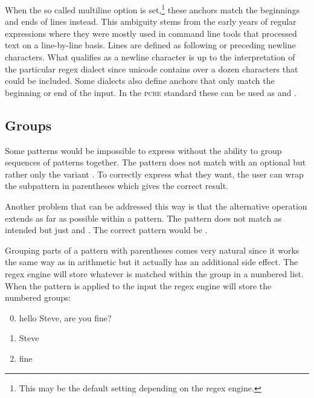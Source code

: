 When the so called multiline option is set,\footnote{This may be the default setting depending on the regex engine.} these anchors match the beginnings and ends of lines instead. This ambiguity stems from the early years of regular expressions where they were mostly used in command line tools that processed text on a line-by-line basis. Lines are defined as following or preceding newline characters. What qualifies as a newline character is up to the interpretation of the particular regex dialect since unicode contains over a dozen characters that could be included. Some dialects also define anchors that only match the beginning or end of the input. In the \textsc{pcre} standard these can be used as  and .

\subsection{Groups} \label{sec:introGroups}

Some patterns would be impossible to express without the ability to group sequences of patterns together. The pattern  does not match  with an optional  but rather only the variant . To correctly express what they want, the user can wrap the subpattern in parentheses  which gives the correct result.

Another problem that can be addressed this way is that the alternative operation extends as far as possible within a pattern. The pattern  does not match  as intended but just  and . The correct pattern would be .

Grouping parts of a pattern with parentheses comes very natural since it works the same way as in arithmetic but it actually has an additional side effect. The regex engine will store whatever is matched within the group in a numbered list. When the pattern  is applied to the input  the regex engine will store the numbered groups:

\begin{enumerate}
    \setcounter{enumi}{-1} 
    \itemsep0em
    \item hello Steve, are you fine?
    \item Steve
    \item fine
\end{enumerate}

